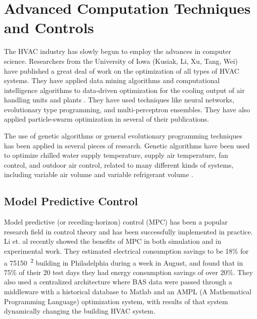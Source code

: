 \section{Advanced Computation Techniques and Controls}

The HVAC industry has slowly begun to employ the advances in computer
science. Researchers from the University of Iowa (Kusiak, Li, Xu, Tang,
Wei) have published a great deal of work on the optimization of all
types of HVAC systems. They have applied data mining algorithms and
computational intelligence algorithms to data-driven optimization for
the cooling output of air handling units and plants
\cite{Kusiak2014MinimizationOfEnergyConsumptionInHVAC, HeXiaofei2014,
    Kusiak2013MinimizingEnergyConsumption,
    Kusiak2012ModelingAndOptimizationOfHVAC, Kusiak2011MultiObjective,
    Kusiak2010ReheatBox, WeiXiupeng2015,
    WeiXiupeng2014ModelingAndOptimizationOfAChillerPlant, Kusiak2010,
Kusiak2010ModelingAndOptimization,
Kusiak2011OptimizationOfAnHVACSystemWithAStrength}. They have used
techniques like neural networks, evolutionary type programming, and
multi-perceptron ensembles. They have also applied particle-swarm
optimization in several of their publications. 

The use of genetic algorithms or general evolutionary programming
techniques has been applied in several pieces of research. Genetic
algorithms have been used to optimize chilled water supply temperature,
supply air temperature, fan control, and outdoor air control, related to
many different kinds of systems, including variable air volume and
variable refrigerant volume
\cite{Fong2006HVACProgramming,Jin2005Prediction-basedSystems,Parameshwaran2010EnergyAlgorithm,Congradac2009HVACAlgorithms}.

\subsection{Model Predictive Control}

Model predictive (or receding-horizon) control (MPC) has been a popular
research field in control theory and has been successfully implemented
in practice. Li et. al \cite{Li2015} recently showed the benefits of MPC
in both simulation and in experimental work. They estimated electrical
consumption savings to be 18\% for a \SI{75150}{\feet\squared} building in
Philadelphia during a week in August, and found that in 75\% of their 20
test days they had energy consumption savings of over 20\%. They also
used a centralized architecture where BAS data were passed through a
middleware with a historical database to Matlab and an AMPL (A
Mathematical Programming Language) optimization system, with results of
that system dynamically changing the building HVAC system.

